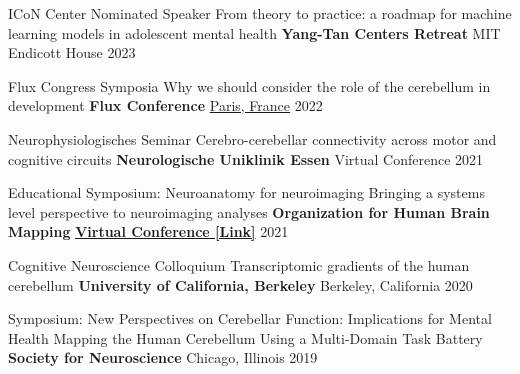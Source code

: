 

\begin{cventries}

  \cventry
    {ICoN Center Nominated Speaker} %
    {From theory to practice: a roadmap for machine learning models in adolescent mental health} %
    {\textbf{Yang-Tan Centers Retreat}} %
    {MIT Endicott House} %
    {2023} %

  \cventry
    {Flux Congress Symposia} %
    {Why we should consider the role of the cerebellum in development} %
    {\textbf{Flux Conference}} %
    {\href{https://youtu.be/u0O88zD28f4?si=uFwx1z4Sw68Qlg5d}{Paris, France}} %
    {2022} %

  \cventry
    {Neurophysiologisches Seminar} %
    {Cerebro-cerebellar connectivity across motor and cognitive circuits} %
    {\textbf{Neurologische Uniklinik Essen}} %
    {Virtual Conference} %
    {2021} %

  \cventry
    {Educational Symposium: Neuroanatomy for neuroimaging} %
    {Bringing a systems level perspective to neuroimaging analyses} %
    {\textbf{Organization for Human Brain Mapping}} %
    {\href{https://www.youtube.com/watch?v=L6nwkvBqJzI}{\textbf{Virtual Conference [Link]}}} %
    {2021} %
    
  \cventry
    {Cognitive Neuroscience Colloquium} %
    {Transcriptomic gradients of the human cerebellum} %
    {\textbf{University of California, Berkeley}} %
    {Berkeley, California} %
    {2020} %

  \cventry
    {Symposium: New Perspectives on Cerebellar Function: Implications for Mental Health} %
    {Mapping the Human Cerebellum Using a Multi-Domain Task Battery} %
    {\textbf{Society for Neuroscience}} %
    {Chicago, Illinois} %
    {2019} %
    

\end{cventries}
